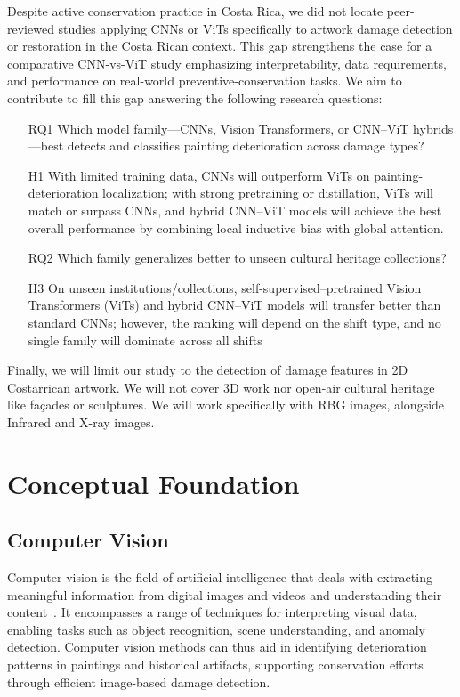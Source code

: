 \documentclass[conference]{IEEEtran}
\begin{document}
Despite active conservation practice in Costa Rica, we did not locate peer-reviewed studies applying CNNs or ViTs specifically to artwork damage detection or restoration in the Costa Rican context. This gap strengthens the case for a comparative CNN-vs-ViT study emphasizing interpretability, data requirements, and performance on real-world preventive-conservation tasks. We aim to contribute to fill this gap answering the following research questions:

\begin{itemize}
    \setlength{\itemindent}{0.5cm}
    \item[RQ1] Which model family—CNNs, Vision Transformers, or CNN–ViT hybrids—best detects and classifies painting deterioration across damage types?
    \item[H1] With limited training data, CNNs will outperform ViTs on painting-deterioration localization; with strong pretraining or distillation, ViTs will match or surpass CNNs, and hybrid CNN–ViT models will achieve the best overall performance by combining local inductive bias with global attention.
    \item[RQ2] Which family generalizes better to unseen cultural heritage collections?
    \item[H3] On unseen institutions/collections, self-supervised–pretrained Vision Transformers (ViTs) and hybrid CNN–ViT models will transfer better than standard CNNs; however, the ranking will depend on the shift type, and no single family will dominate across all shifts
\end{itemize}

Finally, we will limit our study to the detection of damage features in 2D Costarrican artwork. We will not cover 3D work nor open-air cultural heritage like façades or sculptures. We will work specifically with RBG images, alongside Infrared and X-ray images.

\section{Conceptual Foundation}

\subsection{Computer Vision}
Computer vision is the field of artificial intelligence that deals with extracting meaningful information from digital images and videos and understanding their content~\cite{lamarr}. It encompasses a range of techniques for interpreting visual data, enabling tasks such as object recognition, scene understanding, and anomaly detection. Computer vision methods can thus aid in identifying deterioration patterns in paintings and historical artifacts, supporting conservation efforts through efficient image-based damage detection.
\end{document}
